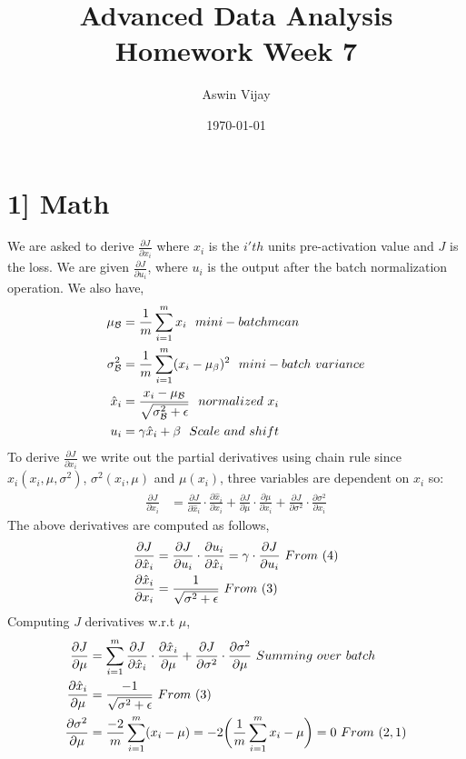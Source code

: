 \documentclass{article}
\title{Advanced Data Analysis\\Homework Week 7}
\author{Aswin Vijay}
\date\today
\begin{document}
\maketitle %

\section*{1] Math}

We are asked to derive $\frac{\partial J}{\partial x_i}$ where $x_i$ is the $i'th$ units pre-activation
value and $J$ is the loss. We are given $\frac{\partial J}{\partial u_i}$, where $u_i$ is the output after the 
batch normalization operation. We also have,
\begin{align}
    \mu_\mathcal{B}  &= \frac{1}{m}\sum_{i=1}^{m}x_i\ \ mini-batch mean\\
    \sigma_\mathcal{B}^2 &=  \frac{1}{m}\sum_{i=1}^{m}(x_i - \mu_\beta)^2\ \ mini-batch\ variance\\
    \hat{x}_i &= \frac{x_i - \mu_\mathcal{B}}{\sqrtsign{\sigma_\mathcal{B}^2 + \epsilon}}\ \ normalized\ x_i\\
    u_i &= \gamma\hat{x}_i + \beta \ \ Scale\ and\ shift
\end{align} 
To derive $\frac{\partial J}{\partial x_i}$ we write out the partial derivatives using chain rule since $\hat{x}_i(x_i,\mu,\sigma^2)$, $\sigma^2(x_i,\mu)$ and $\mu(x_i)$, three variables are dependent on $x_i$ so:
\begin{align*}
    \frac{\partial J}{\partial x_i} &= \frac{\partial J}{\partial \hat{x}_i}\cdot\frac{\partial \hat{x}_i}{\partial x_i} + \frac{\partial J}{\partial \mu}\cdot\frac{\partial \mu}{\partial x_i} + \frac{\partial J}{\partial \sigma^2}\cdot\frac{\partial \sigma^2}{\partial x_i}
\end{align*}
The above derivatives are computed as follows,
\begin{align*}
    \frac{\partial J}{\partial \hat{x}_i} &= \frac{\partial J}{\partial u_i}\cdot\frac{\partial u_i}{\partial \hat{x}_i} = \gamma \cdot \frac{\partial J}{\partial u_i}\ From\ (4)\\
    \frac{\partial \hat{x}_i}{\partial x_i} &= \frac{1}{\sqrtsign{\sigma^2 + \epsilon}}\ From\ (3)\\
\end{align*}
Computing $J$ derivatives w.r.t $\mu$,
\begin{align*}
    \frac{\partial J}{\partial \mu} &= \sum_{i=1}^{m} \frac{\partial J}{\partial \hat{x}_i}\cdot\frac{\partial \hat{x}_i}{\partial \mu} + \frac{\partial J}{\partial \sigma^2}\cdot \frac{\partial \sigma^2}{\partial \mu}\ Summing\ over\ batch\\
    \frac{\partial \hat{x}_i}{\partial \mu} &= \frac{-1}{\sqrtsign{\sigma^2 + \epsilon}}\ From\ (3)\\
    \frac{\partial \sigma^2}{\partial \mu} &= \frac{-2}{m}\sum_{i=1}^{m}(x_i - \mu) = -2\biggl(\frac{1}{m}\sum_{i=1}^{m}x_i - \mu\biggr) = 0\ From\ (2,1)\\
\end{align*}
\end{document}

